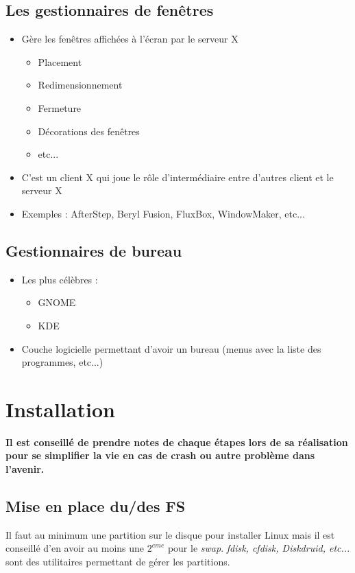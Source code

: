 \documentclass[a4paper]{article}
\begin{document}
    \subsection{Les gestionnaires de fenêtres}
    \begin{itemize}[label=\textbullet, font=\Large]
      \item Gère les fenêtres affichées à l'écran par le serveur X
      \begin{itemize}[label=, font=\scriptsize]
        \item Placement
        \item Redimensionnement
        \item Fermeture
        \item Décorations des fenêtres
        \item etc...
      \end{itemize}
      \item C'est un client X qui joue le rôle d'intermédiaire entre d'autres client et le serveur X
      \item Exemples : AfterStep, Beryl Fusion, FluxBox, WindowMaker, etc...
    \end{itemize}

    \subsection{Gestionnaires de bureau}
    \begin{itemize}[label=\textbullet, font=\Large]
      \item Les plus célèbres :
      \begin{itemize}[label=, font=\scriptsize]
        \item GNOME
        \item KDE
      \end{itemize}
      \item Couche logicielle permettant d'avoir un bureau (menus avec la liste des programmes, etc...)
    \end{itemize}

    \section{Installation}
    \textbf{Il est conseillé de prendre notes de chaque étapes lors de sa réalisation pour se simplifier la vie en cas de crash ou autre problème dans l'avenir.}
    \subsection{Mise en place du/des FS}
    Il faut au minimum une partition sur le disque pour installer 
    Linux mais il est conseillé d'en avoir au moins une $2^{eme}$ 
    pour le \emph{swap}. \emph{fdisk, cfdisk, Diskdruid, etc...} sont des utilitaires permettant de gérer les partitions.
\end{document}
